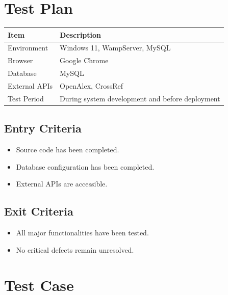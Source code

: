 \documentclass[12pt,a4paper]{article}
\begin{document}
{{\begin{table}[H]
\end{table}

\section{Test Plan}
\begin{table}[H]
	\centering
	\begin{tabular}{|p{4cm}|p{8cm}|}
		\hline
		\textbf{Item} & \textbf{Description} \\ \hline
		Environment & Windows 11, WampServer, MySQL \\ \hline
		Browser & Google Chrome \\ \hline
		Database & MySQL \\ \hline
		External APIs & OpenAlex, CrossRef \\ \hline
		Test Period & During system development and before deployment \\ \hline
	\end{tabular}

\end{table}

\subsection{Entry Criteria}
\begin{itemize}
	\item Source code has been completed.
	\item Database configuration has been completed.
	\item External APIs are accessible.
\end{itemize}

\subsection{Exit Criteria}

\begin{itemize}
	\item All major functionalities have been tested.
	\item No critical defects remain unresolved.
\end{itemize}

\section{Test Case}

}}
\end{document}
